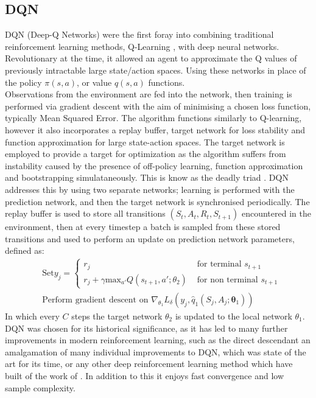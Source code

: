 \documentclass{article}
\begin{document}
\subsection{DQN}
DQN (Deep-Q Networks) \citep{dqn} were the first foray into combining traditional reinforcement learning methods, Q-Learning \citep{qlearning}, with deep neural networks. Revolutionary at the time, it allowed an agent to approximate the Q values of previously intractable large state/action spaces. Using these networks in place of the policy $\pi(s,a)$, or value $q(s,a)$ functions.\\\newline
Observations from the environment are fed into the network, then training is performed via gradient descent with the aim of minimising a chosen loss function, typically Mean Squared Error. The algorithm functions similarly to Q-learning, however it also incorporates a replay buffer, target network for loss stability and function approximation for large state-action spaces. The target network is employed to provide a target for optimization as the algorithm suffers from instability caused by the presence of off-policy learning, function approximation and bootstrapping simulataneously. This is know as the deadly triad \citep{deadlytriad}. DQN addresses this by using two separate networks; learning is performed with the prediction network, and then the target network is synchronised periodically. The replay buffer is used to store all transitions $(S_{t},A_{t},R_{t},S_{t+1})$ encountered in the environment, then at every timestep a batch is sampled from these stored transitions and used to perform an update on prediction network parameters, defined as:
\begin{equation}
\begin{aligned}
    &\text{Set} y_{j} = 
    \begin{cases}
    r_{j} & \text{ for terminal } s_{t+1}\\    
    r_{j} + \gamma\text{max}_{a'}Q(s_{t+1},a'; \theta_{2}) & \text{ for non terminal } s_{t+1}
    \end{cases}\\
    &\text{Perform gradient descent on } \nabla_{\theta_{1}}L_{\delta}(y_{j},\hat{q}_{1}(S_{j},A_{j};\boldsymbol{\theta}_{1}))
\end{aligned}
\end{equation}
In which every $C$ steps the target network $\theta_{2}$ is updated to the local network $\theta_{1}$.\\\newline
DQN was chosen for its historical significance, as it has led to many further improvements in modern reinforcement learning, such as the direct descendant \citet{rainbow} an amalgamation of many individual improvements to DQN, which was state of the art for its time, or any other deep reinforcement learning method which have built of the work of \citet{dqn}. In addition to this it enjoys fast convergence and low sample complexity. 
\end{document}
